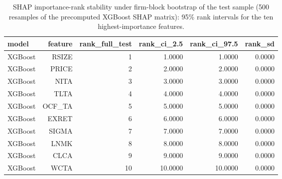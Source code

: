 \begin{table}[htbp]
\centering
\caption{SHAP importance-rank stability under firm-block bootstrap of the test sample (500 resamples of the precomputed XGBoost SHAP matrix): 95\% rank intervals for the ten highest-importance features.}
\label{tab:v2_shap_stability}
\small
\begin{tabular}{lrrrrr}
\toprule
model & feature & rank\_full\_test & rank\_ci\_2.5 & rank\_ci\_97.5 & rank\_sd \\
\midrule
XGBoost & RSIZE & 1 & 1.0000 & 1.0000 & 0.0000 \\
XGBoost & PRICE & 2 & 2.0000 & 2.0000 & 0.0000 \\
XGBoost & NITA & 3 & 3.0000 & 3.0000 & 0.0000 \\
XGBoost & TLTA & 4 & 4.0000 & 4.0000 & 0.0000 \\
XGBoost & OCF\_TA & 5 & 5.0000 & 5.0000 & 0.0000 \\
XGBoost & EXRET & 6 & 6.0000 & 6.0000 & 0.0000 \\
XGBoost & SIGMA & 7 & 7.0000 & 7.0000 & 0.0000 \\
XGBoost & LNMK & 8 & 8.0000 & 8.0000 & 0.0000 \\
XGBoost & CLCA & 9 & 9.0000 & 9.0000 & 0.0000 \\
XGBoost & WCTA & 10 & 10.0000 & 10.0000 & 0.0000 \\
\bottomrule
\end{tabular}
\end{table}
